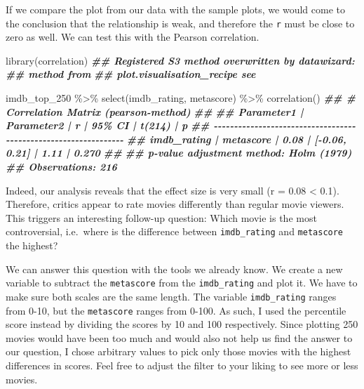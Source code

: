 \documentclass[
]{book}
\newenvironment{Shaded}{\begin{snugshade}}{\end{snugshade}}
\newcommand{\DocumentationTok}[1]{\textcolor[rgb]{0.56,0.35,0.01}{\textbf{\textit{#1}}}}
\newcommand{\FunctionTok}[1]{\textcolor[rgb]{0.00,0.00,0.00}{#1}}
\newcommand{\NormalTok}[1]{#1}
\newcommand{\SpecialCharTok}[1]{\textcolor[rgb]{0.00,0.00,0.00}{#1}}
\begin{document}
If we compare the plot from our data with the sample plots, we would come to the conclusion that the relationship is weak, and therefore the \texttt{r} must be close to zero as well. We can test this with the Pearson correlation.

\begin{Shaded}
\begin{Highlighting}[]
\FunctionTok{library}\NormalTok{(correlation)}
\DocumentationTok{\#\# Registered S3 method overwritten by \textquotesingle{}datawizard\textquotesingle{}:}
\DocumentationTok{\#\#   method                    from}
\DocumentationTok{\#\#   plot.visualisation\_recipe see}

\NormalTok{imdb\_top\_250 }\SpecialCharTok{\%\textgreater{}\%} 
  \FunctionTok{select}\NormalTok{(imdb\_rating, metascore) }\SpecialCharTok{\%\textgreater{}\%} 
  \FunctionTok{correlation}\NormalTok{()}
\DocumentationTok{\#\# \# Correlation Matrix (pearson{-}method)}
\DocumentationTok{\#\# }
\DocumentationTok{\#\# Parameter1  | Parameter2 |    r |        95\% CI | t(214) |     p}
\DocumentationTok{\#\# {-}{-}{-}{-}{-}{-}{-}{-}{-}{-}{-}{-}{-}{-}{-}{-}{-}{-}{-}{-}{-}{-}{-}{-}{-}{-}{-}{-}{-}{-}{-}{-}{-}{-}{-}{-}{-}{-}{-}{-}{-}{-}{-}{-}{-}{-}{-}{-}{-}{-}{-}{-}{-}{-}{-}{-}{-}{-}{-}{-}{-}{-}{-}{-}}
\DocumentationTok{\#\# imdb\_rating |  metascore | 0.08 | [{-}0.06, 0.21] |   1.11 | 0.270}
\DocumentationTok{\#\# }
\DocumentationTok{\#\# p{-}value adjustment method: Holm (1979)}
\DocumentationTok{\#\# Observations: 216}
\end{Highlighting}
\end{Shaded}

Indeed, our analysis reveals that the effect size is very small (r = 0.08 \textless{} 0.1). Therefore, critics appear to rate movies differently than regular movie viewers. This triggers an interesting follow-up question: Which movie is the most controversial, i.e.~where is the difference between \texttt{imdb\_rating} and \texttt{metascore} the highest?

We can answer this question with the tools we already know. We create a new variable to subtract the \texttt{metascore} from the \texttt{imdb\_rating} and plot it. We have to make sure both scales are the same length. The variable \texttt{imdb\_rating} ranges from 0-10, but the \texttt{metascore} ranges from 0-100. As such, I used the percentile score instead by dividing the scores by 10 and 100 respectively. Since plotting 250 movies would have been too much and would also not help us find the answer to our question, I chose arbitrary values to pick only those movies with the highest differences in scores. Feel free to adjust the filter to your liking to see more or less movies.
\end{document}
